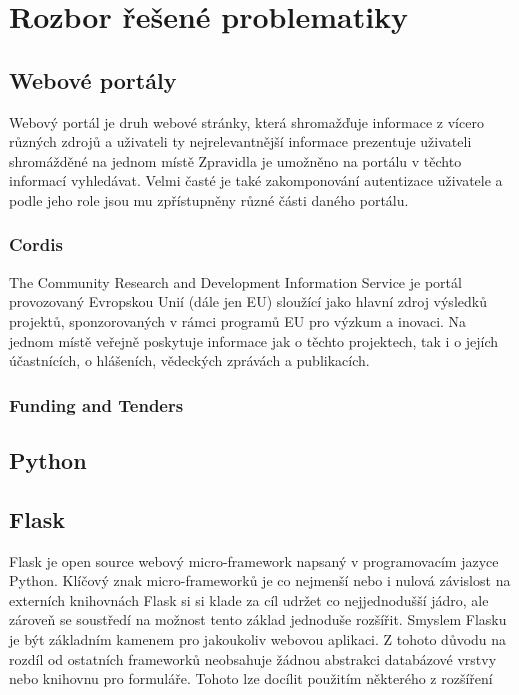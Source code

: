 \chapter{Rozbor řešené problematiky}

\section{Webové portály}
Webový portál je druh webové stránky, která shromažďuje informace z vícero různých zdrojů a uživateli ty nejrelevantnější informace prezentuje uživateli shromážděné na jednom místě %
Zpravidla je umožněno na portálu v těchto informací vyhledávat. Velmi časté je také zakomponování autentizace uživatele a podle jeho role jsou mu zpřístupněny různé části daného portálu. %
\blindtext[2]

\subsection{Cordis}
The Community Research and Development Information Service je portál provozovaný Evropskou Unií (dále jen EU) sloužící jako hlavní zdroj výsledků projektů, sponzorovaných v rámci programů EU pro výzkum a inovaci. Na jednom místě veřejně poskytuje informace jak o těchto projektech, tak i o jejích účastnících, o hlášeních, vědeckých zprávách a publikacích.
\blindtext

\subsection{Funding and Tenders}
\blindtext

\section{Python}
\blindtext[2]

\section{Flask}
Flask je open source webový micro-framework napsaný v programovacím jazyce Python. Klíčový znak micro-frameworků je co nejmenší nebo i nulová závislost na externích knihovnách %
Flask si si klade za cíl udržet co nejjednodušší jádro, ale zároveň se soustředí na možnost tento základ jednoduše rozšířit.
Smyslem Flasku je být základním kamenem pro jakoukoliv webovou aplikaci. Z tohoto důvodu na rozdíl od ostatních frameworků neobsahuje žádnou abstrakci databázové vrstvy nebo knihovnu pro formuláře. Tohoto lze docílit použitím některého z rozšíření %

